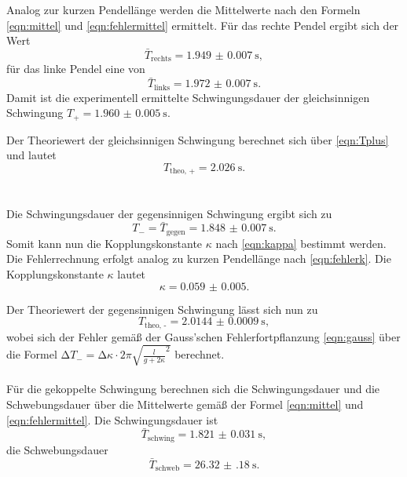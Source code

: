   \noindent Analog zur kurzen Pendellänge werden die Mittelwerte nach den Formeln \eqref{eqn:mittel} und \eqref{eqn:fehlermittel} ermittelt. 
  Für das rechte Pendel ergibt sich der Wert
  \begin{equation*}
    \bar{T}_{\text{rechts}} = \SI{1.949(7)}{\second}, 
  \end{equation*}
  für das linke Pendel eine von 
  \begin{equation*}
    \bar{T}_{\text{links}} = \SI{1.972(7)}{\second}. 
  \end{equation*}
  Damit ist die experimentell ermittelte Schwingungsdauer der gleichsinnigen Schwingung $ T_{+} = \SI{1.960(5)}{\second}$.
  
  \noindent Der Theoriewert der gleichsinnigen Schwingung berechnet sich über \eqref{eqn:Tplus} und lautet 
  \begin{equation*}
    T_{\text{theo, +}} = \SI{2.026}{\second}.
  \end{equation*} \\ \\

  \noindent Die Schwingungsdauer der gegensinnigen Schwingung ergibt sich zu 
  \begin{equation*}
      T_{-} = \bar{T}_{\text{gegen}} = \SI{1.848(7)}{\second}.
  \end{equation*}
  Somit kann nun die Kopplungskonstante $\kappa $ nach \eqref{eqn:kappa} bestimmt werden. Die Fehlerrechnung erfolgt analog zu kurzen Pendellänge
  nach \eqref{eqn:fehlerk}. 
  Die Kopplungskonstante $\kappa$ lautet 
  \begin{equation*}
      \kappa = \num{0.059(5)}.
  \end{equation*}

  \noindent Der Theoriewert der gegensinnigen Schwingung lässt sich nun zu 
  \begin{equation*}
      T_{\text{theo, -}} = \SI{2.0144(9)}{\second}, 
  \end{equation*}
  wobei sich der Fehler gemäß der Gauss'schen Fehlerfortpflanzung \eqref{eqn:gauss} über die Formel $\increment T_{-} = \increment \kappa \cdot 2 \pi \sqrt{\frac{l}{g + 2\kappa }^2} $ berechnet. \\ \\

  \noindent Für die gekoppelte Schwingung berechnen sich die Schwingungsdauer und die Schwebungsdauer über die Mittelwerte gemäß der Formel \eqref{eqn:mittel} und \eqref{eqn:fehlermittel}. 
  Die Schwingungsdauer ist 
  \begin{equation*}
    \bar{T}_{\text{schwing}} = \SI{1.821(31)}{\second}, 
  \end{equation*} 
  die Schwebungsdauer
  \begin{equation*}
    \bar{T}_{\text{schweb}} = \SI{26.32(18)}{\second}.
  \end{equation*}

